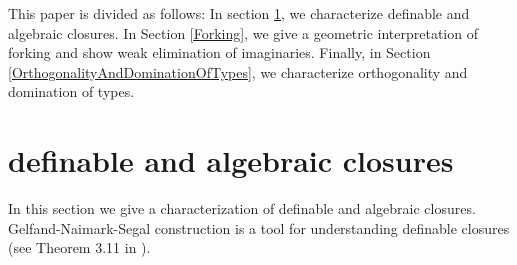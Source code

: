 \documentclass{amsart}
\theoremstyle{definition}
\theoremstyle{remark}
\begin{document}
This paper is divided as follows: In section \ref{SectionDefinableAndAlgebraicClosures}, we characterize definable and algebraic closures. In Section \ref{Forking}, we give a geometric interpretation of forking and show weak elimination of imaginaries. Finally, in Section \ref{OrthogonalityAndDominationOfTypes}, we characterize orthogonality and domination of types.



\section{definable and algebraic closures}\label{SectionDefinableAndAlgebraicClosures}
In this section we give a characterization of definable and algebraic closures. Gelfand-Naimark-Segal construction is a tool for understanding definable closures (see Theorem 3.11 in \cite{Ar}). %
\end{document}
